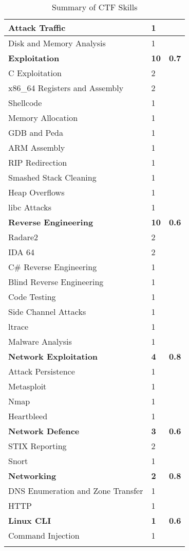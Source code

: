 \documentclass[a4paper,11pt]{report}
\begin{document}
\begin{center}
\begin{longtable}{| l | l | l |}
					\quad Attack Traffic & 1 & \\ \hline 
					\quad Disk and Memory Analysis & 1 & \\ \hline 
					\textbf{Exploitation} & \textbf{10} & \textbf{0.7} \\ \hline
					\quad C Exploitation & 2 & \\ \hline 
					\quad x86\_64 Registers and Assembly & 2 & \\ \hline
					\quad Shellcode & 1 & \\ \hline
					\quad Memory Allocation & 1 & \\ \hline
					\quad GDB and Peda & 1 & \\ \hline
					\quad ARM Assembly & 1 & \\ \hline
					\quad RIP Redirection & 1 & \\ \hline 
					\quad Smashed Stack Cleaning & 1 & \\ \hline 
					\quad Heap Overflows & 1 & \\ \hline 
					\quad libc Attacks & 1 & \\ \hline 
					\textbf{Reverse Engineering} & \textbf{10} & \textbf{0.6}\\ \hline 
					\quad Radare2 & 2 & \\ \hline 
					\quad IDA 64 & 2 & \\ \hline 
					\quad C\# Reverse Engineering & 1 & \\ \hline
					\quad Blind Reverse Engineering & 1 & \\ \hline 
					\quad Code Testing & 1 & \\ \hline 
					\quad Side Channel Attacks & 1 & \\ \hline 
					\quad ltrace & 1 & \\ \hline 
					\quad Malware Analysis & 1 & \\ \hline
					\textbf{Network Exploitation} & \textbf{4} & \textbf{0.8} \\ \hline 
					\quad Attack Persistence & 1 & \\ \hline 
					\quad Metasploit & 1 & \\ \hline 
					\quad Nmap & 1 & \\ \hline 
					\quad Heartbleed & 1 & \\ \hline
					\textbf{Network Defence} & \textbf{3} & \textbf{0.6} \\ \hline
					\quad STIX Reporting & 2 & \\ \hline
					\quad Snort & 1 & \\ \hline
					\textbf{Networking} & \textbf{2} & \textbf{0.8}\\ \hline
					\quad DNS Enumeration and Zone Transfer & 1 & \\ \hline 
					\quad HTTP & 1 & \\ \hline 
					\textbf{Linux CLI} & \textbf{1} &\textbf{0.6} \\ \hline
					\quad Command Injection & 1 & \\ \hline 
					\caption{\label{tab:summary}Summary of CTF Skills}
				\end{longtable}
			\end{center}
	
\end{document}
